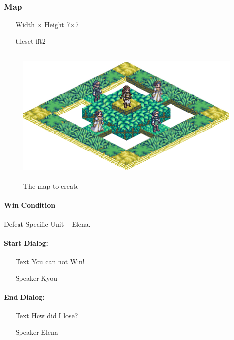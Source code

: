 \subsubsection*{Map}
\begin{itemize}[topsep=0mm,noitemsep ]
	\item[Width $\times$ Height] 7$\times$7
	\item[tileset] fft2	
\end{itemize}

\begin{figure}[htbp]
	\centering
		\includegraphics[height=2.7in]{figures/Task.png}
	\caption{The map to create}
	\label{fig:figures_Task}
\end{figure}


\paragraph{Win Condition}
Defeat Specific Unit   -- Elena.

\paragraph{Start Dialog:}
\begin{itemize}[topsep=0mm,noitemsep]
	\item[Text]  You can not Win!
	\item[Speaker] Kyou
\end{itemize}

\paragraph{End Dialog:}
\begin{itemize}[topsep=0mm,noitemsep]
	\item[Text]  How did I lose?
	\item[Speaker] Elena
\end{itemize}

